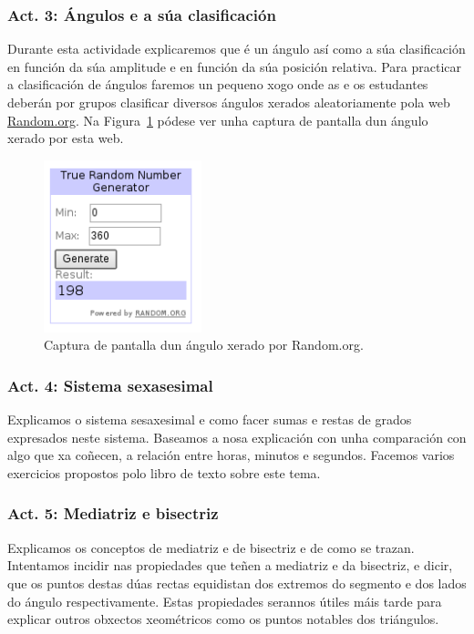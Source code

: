 \subsubsection{Act. 3: Ángulos e a súa clasificación}\label{act3}
Durante esta actividade explicaremos que é un ángulo así como a súa clasificación en función da súa amplitude e en función da súa posición relativa. Para practicar a clasificación de ángulos faremos un pequeno xogo onde as e os estudantes deberán por grupos clasificar diversos ángulos xerados aleatoriamente pola web \href{http://random.org}{Random.org}. Na Figura~\ref{fig:act5} pódese ver unha captura de pantalla dun ángulo xerado por esta web.

\begin{figure}[h!]
  \centering
  \includegraphics[height=5cm]{img/random.png}
  \caption{Captura de pantalla dun ángulo xerado por Random.org.}\label{fig:act5}
\end{figure}

\subsubsection{Act. 4: Sistema sexasesimal} %
Explicamos o sistema sesaxesimal e como facer sumas e restas de grados expresados neste sistema. Baseamos a nosa explicación con unha comparación con algo que xa coñecen, a relación entre horas, minutos e segundos. Facemos varios exercicios propostos polo libro de texto sobre este tema.

\subsubsection{Act. 5: Mediatriz e bisectriz} %
Explicamos os conceptos de mediatriz e de bisectriz e de como se trazan. Intentamos incidir nas propiedades que teñen a mediatriz e da bisectriz, e dicir, que os puntos destas dúas rectas equidistan dos extremos do segmento e dos lados do ángulo respectivamente. Estas propiedades serannos útiles máis tarde para explicar outros obxectos xeométricos como os puntos notables dos triángulos.

